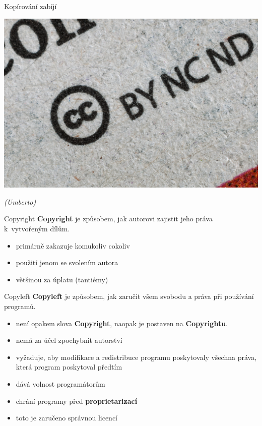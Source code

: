 \documentclass[11pt]{beamer}
\begin{document}
	\begin{frame}{Kopírování zabíjí}
	\begin{center}
		\includegraphics[width=\textwidth]{images/cc.jpg}
	\end{center}
	\begin{flushright}
		\textit{(Umberto)}
	\end{flushright}
	\end{frame}

	\begin{frame}{Copyright}
	\textbf{Copyright} je způsobem, jak autorovi zajistit jeho práva k~vytvořeným dílům.
	\begin{itemize}
		\item primárně zakazuje komukoliv cokoliv
		\item použití jenom se svolením autora
		\item většinou za úplatu (tantiémy)
	\end{itemize}
	\end{frame}	

	\begin{frame}{Copyleft}
	\textbf{Copyleft} je způsobem, jak zaručit všem svobodu a práva při používání programů.
	\begin{itemize}
		\item není opakem slova \textbf{Copyright}, naopak je postaven na \textbf{Copyrightu}.
		\item nemá za účel zpochybnit autorství
		\item vyžaduje, aby modifikace a redistribuce programu poskytovaly všechna práva, která program poskytoval předtím
		\item dává volnost programátorům
		\item chrání programy před \textbf{proprietarizací}
		\item toto je zaručeno správnou licencí
	\end{itemize}
\end{frame}	
\end{document}
